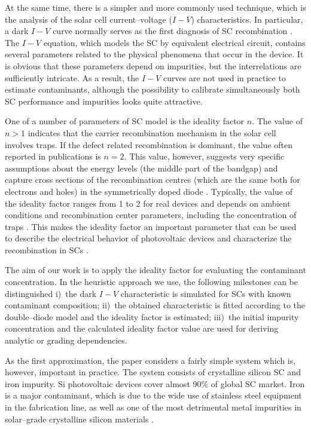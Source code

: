 \documentclass [sort&compress] {elsarticle}
\begin{document}
At the same time, there is a simpler and more commonly used technique, which is the analysis of the solar cell current--voltage ($I-V$) characteristics.
In particular, a dark $I-V$ curve normally serves as the first diagnosis of SC recombination \cite{Grover}.
The $I-V$  equation, which models the SC by equivalent electrical circuit, contains several parameters related to the physical phenomena that occur in the device.
It is obvious that these parameters depend on impurities, but the interrelations are sufficiently intricate.
As a result, the $I-V$ curves are not used in practice to estimate contaminants, although the possibility to calibrate simultaneously both SC performance and impurities looks quite attractive.

One of a number of parameters of SC model is the ideality factor $n$.
The value of $n>1$ indicates that the carrier recombination mechanism in the solar cell involves traps.
If the defect related recombination is dominant, the value often reported in publications is $n=2$.
This value, however, suggests very specific assumptions about  the  energy levels (the middle part of  the  bandgap) and capture cross sections  of  the recombination centres (which are the same both  for electrons and  holes) in the symmetrically  doped diode \cite{n2Kuhn,n2_Beier}.
Typically, the value of the ideality factor ranges from 1 to 2 for real devices and depends on ambient conditions and recombination center parameters, including the concentration of traps \cite{n2_Beier,n2McIntosh,n2Kaminski,HAMEIRI2013251,Heide}.
This makes the ideality factor an important parameter that can be used to describe the electrical behavior of photovoltaic devices and characterize the recombination in SCs \cite{Duan}.

The aim of our work is to apply the ideality factor for evaluating the contaminant concentration.
In the heuristic approach we use, the following milestones can be distinguished
i)~the dark $I-V$ characteristic is simulated for SCs with known contaminant composition;
ii)~the obtained characteristic is fitted according to the double--diode model and the ideality factor is estimated;
iii)~the initial impurity concentration and the calculated ideality factor value are used for deriving analytic or grading dependencies.

As the first approximation, the paper considers a fairly simple system which is, however, important in practice.
The system consists of crystalline silicon SC and iron impurity.
Si photovoltaic devices cover almost 90\% of global SC market.
Iron is a major contaminant, which is due to the wide use of stainless steel equipment in the fabrication line, as well as one of the most detrimental metal impurities in solar--grade crystalline silicon materials \cite{Istratov1999,FeB:Schmidt,ZHU2016192}.
\end{document}
